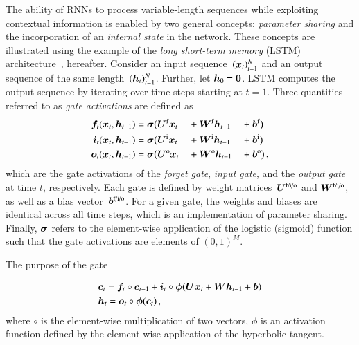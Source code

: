 The ability of RNNs to process variable-length sequences while exploiting
contextual information is enabled by two general concepts: \emph{parameter
  sharing} and the incorporation of an \emph{internal state} in the
network. These concepts are illustrated using the example of the \emph{long
  short-term memory} (LSTM) architecture~\cite{lstm,gers2000learning},
hereafter. Consider an input sequence~$(\bm{x}_{t})_{t = 1}^{N}$ and an
output sequence of the same length~$(\bm{h}_{t})_{t = 1}^{N}$. Further, let
$\bm{h}_{0} = \bm{0}$.  LSTM computes the output sequence by iterating
over time steps starting at $t = 1$. Three quantities referred to as \emph{gate
  activations} are defined as~\cite{Goodfellow-et-al-2016}
\begin{alignat*}{3}
  \bm{f}_{t}(\bm{x}_{t}, \bm{h}_{t-1}) &= \bm{\sigma}\bigl(\bm{U}^{\text{f}}  \bm{x}_{t} &&+ \bm{W}^{\text{f}}  \bm{h}_{t - 1} &&+ \bm{b}^{\text{f}}\bigr) \\
  \bm{i}_{t}(\bm{x}_{t}, \bm{h}_{t-1}) &= \bm{\sigma}\bigl(\bm{U}^{\text{i}}  \bm{x}_{t} &&+ \bm{W}^{\text{i}}  \bm{h}_{t - 1} &&+ \bm{b}^{\text{i}}\bigr) \\
  \bm{o}_{t}(\bm{x}_{t}, \bm{h}_{t-1}) &= \bm{\sigma}\bigl(\bm{U}^{\text{o}}  \bm{x}_{t} &&+ \bm{W}^{\text{o}}  \bm{h}_{t - 1} &&+ \bm{b}^{\text{o}}\bigr) \,\text{,}
\end{alignat*}
which are the gate activations of the \emph{forget gate}, \emph{input gate}, and
the \emph{output gate} at time $t$, respectively. Each gate is defined by weight
matrices~$\bm{U}^{\text{f/i/o}}$ and $\bm{W}^{\text{f/i/o}}$, as well as a
bias vector~$\bm{b}^{\text{f/i/o}}$. For a given gate, the weights and biases
are identical across all time steps, which is an implementation of parameter
sharing. Finally, $\bm{\sigma}$ refers to the element-wise application of the
logistic (sigmoid) function such that the gate activations are elements of
$(0, 1)^{M}$.




The purpose of the gate

\begin{align*}
  &\bm{c}_{t} = \bm{f}_{t} \circ \bm{c}_{t - 1}
    + \bm{i}_{t} \circ \bm{\phi}(\bm{U} \bm{x}_{t} + \bm{W} \bm{h}_{t-1} + \bm{b}) \\
  &\bm{h}_{t} = \bm{o}_{t} \circ \bm{\phi}(\bm{c}_{t}) \,\text{,}
\end{align*}
where $\circ$ is the element-wise multiplication of two vectors, $\phi$ is an
activation function defined by the element-wise application of the hyperbolic
tangent.














